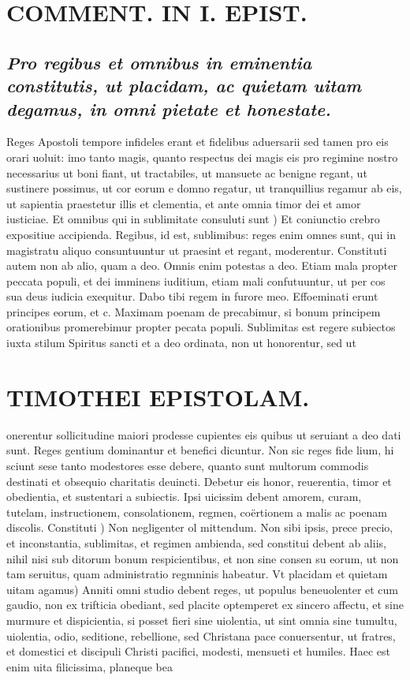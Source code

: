 \documentclass{article}
\begin{document}
\begin{pages}
\section*{COMMENT. IN I. EPIST. }
\marginpar{[ p.44 ]}
{}
\subsection*{\textit{Pro regibus et omnibus in eminentia constitutis, ut placidam, ac quietam uitam degamus, in omni pietate et honestate. }}\pstart Reges Apostoli tempore infideles erant et fidelibus aduersarii sed tamen pro eis orari uoluit: imo tanto magis, quanto respectus dei magis eis pro regimine nostro necessarius ut boni fiant, ut tractabiles, ut mansuete ac benigne regant, ut sustinere possimus, ut cor eorum e domno regatur, ut tranquillius regamur ab eis, ut sapientia praestetur illis et clementia, et ante omnia timor dei et amor iusticiae.  \pend\pstart Et omnibus qui in sublimitate consuluti sunt ) Et coniunctio crebro expositiue accipienda. Regibus, id est, sublimibus: reges enim omnes sunt, qui in magistratu aliquo consuntuuntur ut praesint et regant, moderentur. Constituti autem non ab alio, quam a deo. Omnis enim potestas a deo. Etiam mala propter peccata populi, et dei imminens iuditium, etiam mali confutuuntur, ut per cos sua deus iudicia exequitur. Dabo tibi regem in furore meo. Effoeminati erunt principes eorum, et c. Maximam poenam de precabimur, si bonum principem orationibus promerebimur propter pecata populi.  \pend\pstart Sublimitas est regere subiectos iuxta stilum Spiritus sancti et a deo ordinata, non ut honorentur, sed ut  \pend
\section*{TIMOTHEI EPISTOLAM. }
\marginpar{[ p.45 ]}\pstart onerentur sollicitudine maiori prodesse cupientes eis quibus ut seruiant a deo dati sunt. Reges gentium dominantur et benefici dicuntur. Non sic reges fide lium, hi sciunt sese tanto modestores esse debere, quanto sunt multorum commodis destinati et obsequio charitatis deuincti. Debetur eis honor, reuerentia, timor et obedientia, et sustentari a subiectis. Ipsi uicissim debent amorem, curam, tutelam, instructionem, consolationem, regmen, coërtionem a malis ac poenam discolis.  \pend\pstart Constituti ) Non negligenter ol mittendum. Non sibi ipsis, prece precio, et inconstantia, sublimitas, et regimen ambienda, sed constitui debent ab aliis, nihil nisi sub ditorum bonum respicientibus, et non sine consen su eorum, ut non tam seruitus, quam administratio regmninis habeatur.  \pend\pstart Vt placidam et quietam uitam agamus) Anniti omni studio debent reges, ut populus beneuolenter et cum gaudio, non ex trifticia obediant, sed placite optemperet ex sincero affectu, et sine murmure et dispicientia, si posset fieri sine uiolentia, ut sint omnia sine tumultu, uiolentia, odio, seditione, rebellione, sed Christana pace conuersentur, ut fratres, et domestici et discipuli Christi pacifici, modesti, mensueti et humiles. Haec est enim uita filicissima, planeque bea\pend

\end{pages}
\end{document}
